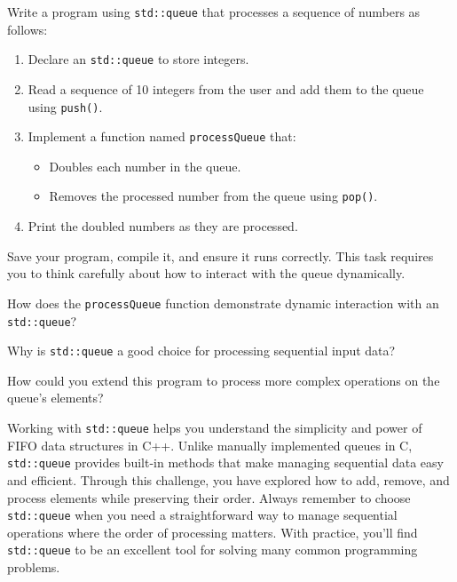 \begin{challenge}
    \begin{task}
        Write a program using \texttt{std::queue} that processes a sequence of numbers as follows:
        \begin{enumerate}
            \item Declare an \texttt{std::queue} to store integers.
            \item Read a sequence of 10 integers from the user and add them to the queue using \texttt{push()}.
            \item Implement a function named \texttt{processQueue} that:
                \begin{itemize}
                    \item Doubles each number in the queue.
                    \item Removes the processed number from the queue using \texttt{pop()}.
                \end{itemize}
            \item Print the doubled numbers as they are processed.
        \end{enumerate}

        Save your program, compile it, and ensure it runs correctly. This task requires you to think carefully about how to interact with the queue dynamically.

        \begin{questions}
            \item How does the \texttt{processQueue} function demonstrate dynamic interaction with an \texttt{std::queue}?
            \item Why is \texttt{std::queue} a good choice for processing sequential input data?
            \item How could you extend this program to process more complex operations on the queue’s elements?
        \end{questions}
    \end{task}

    \begin{advise}
        Working with \texttt{std::queue} helps you understand the simplicity and power of FIFO data structures in C++. 
        Unlike manually implemented queues in C, \texttt{std::queue} provides built-in methods that make managing sequential data easy and efficient. 
        Through this challenge, you have explored how to add, remove, and process elements while preserving their order. 
        Always remember to choose \texttt{std::queue} when you need a straightforward way to manage sequential operations where the order of processing matters. 
        With practice, you'll find \texttt{std::queue} to be an excellent tool for solving many common programming problems.
    \end{advise}
\end{challenge}
